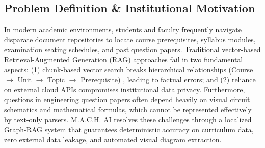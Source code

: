 \documentclass[11pt, a4paper]{article}
\begin{document}
\subsection{Problem Definition \& Institutional Motivation}
\noindent
In modern academic environments, students and faculty frequently navigate disparate document repositories to locate course prerequisites, syllabus modules, examination seating schedules, and past question papers. Traditional vector-based Retrieval-Augmented Generation (RAG) approaches \cite{gao2023rag,izacard2021leveraging} fail in two fundamental aspects: (1) chunk-based vector search breaks hierarchical relationships (Course $\rightarrow$ Unit $\rightarrow$ Topic $\rightarrow$ Prerequisite) \cite{sitaram2022curriculum,edge2024graphrag}, leading to factual errors; and (2) reliance on external cloud APIs compromises institutional data privacy. Furthermore, questions in engineering question papers often depend heavily on visual circuit schematics and mathematical formulas, which cannot be represented effectively by text-only parsers. M.A.C.H. AI resolves these challenges through a localized Graph-RAG system that guarantees deterministic accuracy on curriculum data, zero external data leakage, and automated visual diagram extraction.
\end{document}
